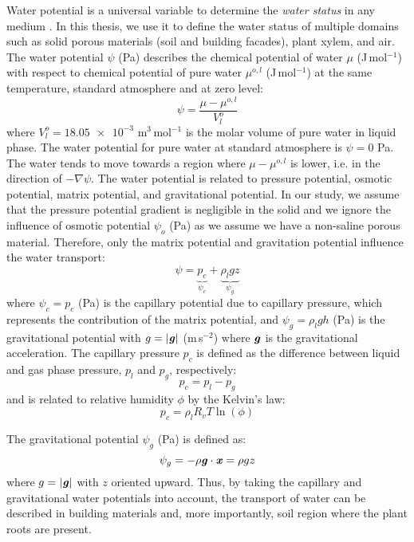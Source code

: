Water potential is a universal variable to determine the \textit{water status} in any medium \citep{nobel2009physicochemical}. In this thesis, we use it to define the water status of multiple domains such as solid porous materials (soil and building facades), plant xylem, and air. The water potential $\psi$ (Pa) describes the chemical potential of water $\mu$ (J\,mol$^{-1}$) with respect to chemical potential of pure water $\mu^{o,l}$ (J\,mol$^{-1}$) at the same temperature, standard atmosphere and at zero level:
\begin{equation}
\psi = \frac{\mu - \mu^{o,l}}{V^o_l}
\end{equation}
where $V^o_l = 18.05 \num{e-3}$ m$^3$\,mol$^{-1}$ is the molar volume of pure water in liquid phase. The water potential for pure water at standard atmosphere is $\psi = 0$ Pa. The water tends to move towards a region where $\mu-\mu^{o,l}$ is lower, i.e. in the direction of $-\nabla\psi$. The water potential is related to pressure potential, osmotic potential, matrix potential, and gravitational potential. In our study, we assume that the pressure potential gradient is negligible in the solid and we ignore the influence of osmotic potential $\psi_o$ (Pa) as we assume we have a non-saline porous material. Therefore, only the matrix potential and gravitation potential influence the water transport:
\begin{equation}
\psi = \underbrace{p_c}_{\psi_c} + \underbrace{\rho_l g z}_{\psi_g}
\end{equation}
where $\psi_c = p_c$ (Pa) is the capillary potential due to capillary pressure, which represents the contribution of the matrix potential, and $\psi_g = \rho_l g h$ (Pa) is the gravitational potential with $g = |\textbf{\textit{g}}|$ (m\,s$^{-2}$) where $\textbf{\textit{g}}$ is the gravitational acceleration. The capillary pressure $p_c$ is defined as the difference between liquid and gas phase pressure, $p_l$ and $p_g$, respectively:
\begin{equation}
p_c =  p_l - p_g
\end{equation}
and is related to relative humidity $\phi$ by the Kelvin's law:
\begin{equation}
p_c = \rho_l R_v T \ln \left(\phi\right)
\end{equation}

The gravitational potential $\psi_g$ (Pa) is defined as:
\begin{equation}
\psi_g = - \rho \textbf{\textit{g}} \cdot \textbf{\textit{x}} = \rho g z
\end{equation}
where $g = |\textbf{\textit{g}}|$ with $z$ oriented upward. Thus, by taking the capillary and gravitational water potentials into account, the transport of water can be described in building materials and, more importantly, soil region where the plant roots are present.

